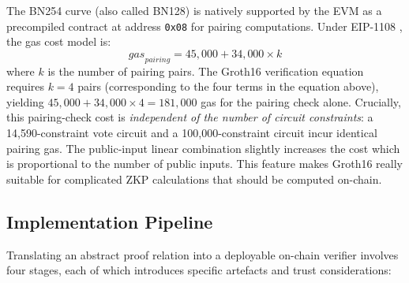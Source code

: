 The BN254 curve (also called BN128) is natively supported by the EVM as a precompiled contract at address \texttt{0x08} for pairing computations. Under EIP-1108 \cite{eip1108}, the gas cost model is:
\begin{equation}
    \mathit{gas}_{\mathit{pairing}} = 45{,}000 + 34{,}000 \times k
\end{equation}
where $k$ is the number of pairing pairs. The Groth16 verification equation requires $k = 4$ pairs (corresponding to the four terms in the equation above), yielding $45{,}000 + 34{,}000 \times 4 = 181{,}000$ gas for the pairing check alone. Crucially, this pairing-check cost is \emph{independent of the number of circuit constraints}: a 14{,}590-constraint vote circuit and a 100{,}000-constraint circuit incur identical pairing gas. The public-input linear combination slightly increases the cost which is proportional to the number of public inputs. This feature makes Groth16 really suitable for complicated ZKP calculations that should be computed on-chain.

\subsection{Implementation Pipeline}

Translating an abstract proof relation into a deployable on-chain verifier involves four stages, each of which introduces specific artefacts and trust considerations:

